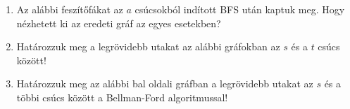 \documentclass[a4paper,12pt]{article}
\begin{document}
    \noindent{}
    \noindent{}
    \begin{enumerate}
        \item Az alábbi feszítőfákat az $a$ csúcsokból indított BFS után kaptuk meg. Hogy nézhetett ki az eredeti gráf az egyes esetekben? 
        \begin{figure}[!h]
            \centering
            \begin{subfigure}{0.2\textwidth}
                \centering
                
            \end{subfigure}
            \begin{subfigure}{0.2\textwidth}
                \centering		
                
            \end{subfigure}
            \begin{subfigure}{0.2\textwidth}
                \centering
                
            \end{subfigure}
            \begin{subfigure}{0.2\textwidth}
                \centering
                
            \end{subfigure}
        \end{figure}

        \item Határozzuk meg a legrövidebb utakat az alábbi gráfokban az $s$ és a $t$ csúcs között!
        \begin{figure}[!h]
            \centering
            
            
        \end{figure}
        \item Határozzuk meg az alábbi bal oldali gráfban a legrövidebb utakat az $s$ és a többi csúcs között a Bellman-Ford algoritmussal!
        \begin{figure}[h]
            \centering
            \begin{subfigure}{0.4\textwidth}
                \centering
                
            \end{subfigure}
            \begin{subfigure}{0.4\textwidth}
                \centering
                
            \end{subfigure}
        \end{figure}
        

\end{enumerate}
\end{document}
